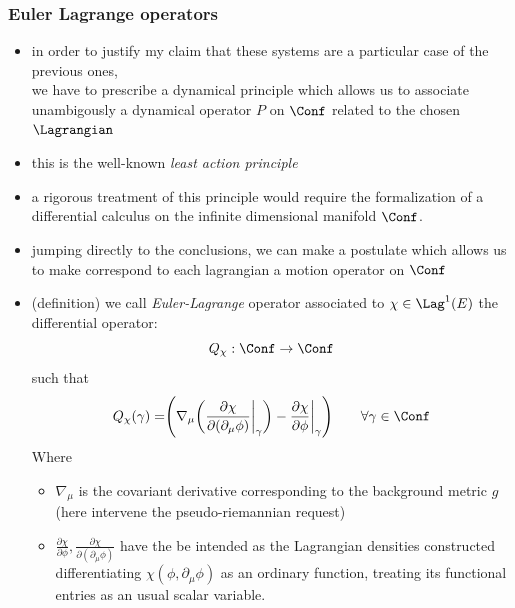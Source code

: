 \documentclass[a4paper,11pt]{scrartcl}
\begin{document}
    \subsubsection*{Euler Lagrange operators}
    \begin{itemize}
        \item in order to justify my claim that these systems are a particular case of the previous ones,\\
         we have to prescribe a dynamical principle which allows us to associate unambigously a dynamical operator $P$ on $\Conf$ related to the chosen $\Lagrangian$
         \item this is the well-known \emph{least action principle}
         \item a rigorous treatment of this principle would require the formalization of a differential calculus on the infinite dimensional  manifold $\Conf$.
         \item jumping directly to the conclusions, we can make a postulate which allows us to make correspond to each lagrangian a motion operator on $\Conf$
         \item (definition) we call \emph{Euler-Lagrange} operator associated to $\chi \in \Lag^1(E)$ the differential operator:
         $$ Q_\chi : \Conf \rightarrow \Conf $$
         such that
         $$     Q_\chi (\gamma) = \Biggr( \nabla_\mu \biggr( \frac{\partial \chi}{\partial(\partial_\mu \phi)} \biggr\vert_\gamma \biggr) - \frac{\partial \chi}{\partial \phi}\biggr\vert_\gamma \Biggr) \qquad \forall \gamma \in \Conf $$
        Where 
        \begin{itemize}
            \item $\nabla_\mu$ is the covariant derivative corresponding to the background metric $g$ (here intervene the pseudo-riemannian request)
            \item $\frac{\partial \chi}{\partial \phi} , \frac{\partial \chi}{\partial(\partial_\mu \phi)}$ have the be intended as the Lagrangian densities constructed differentiating $\chi(\phi, \partial_\mu \phi)$ as an ordinary function, treating its functional entries as an usual scalar variable.
        \end{itemize}
    \end{itemize}
\end{document}
